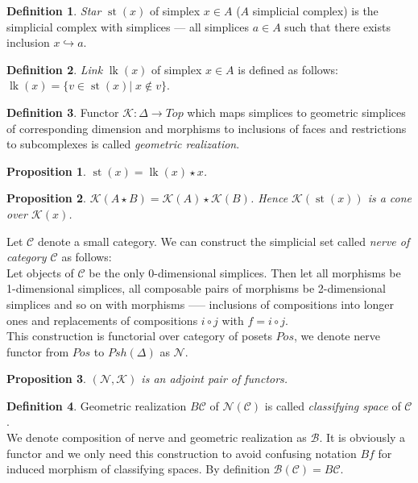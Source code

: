 \documentclass[a4paper, 12pt]{article}
\newtheorem{proposition}{Proposition}
\theoremstyle{definition}
\newtheorem{definition}{Definition}
\theoremstyle{remark}
\newcommand{\define}[1]{{\textit{#1}}}
\begin{document}
\begin{definition}
  \define{Star} $\operatorname{st}(x)$ of simplex $x \in A$ ($A$ simplicial complex) is the simplicial complex with simplices --- all simplices $a \in A$ such that there exists inclusion $x \hookrightarrow a$.
\end{definition}

\begin{definition}
  \define{Link} $\operatorname{lk}(x)$ of simplex $x \in A$ is defined as follows: $\operatorname{lk}(x) = \{v \in \operatorname{st}(x)|\; x \not\in v\}$.
\end{definition}

\begin{definition}
  Functor $\mathcal{K} : \Delta \to Top$ which maps simplices to geometric simplices of corresponding dimension and morphisms to inclusions of faces and restrictions to subcomplexes is called \define{geometric realization}.
\end{definition}

\begin{proposition}
  $\operatorname{st}(x) = \operatorname{lk}(x) \star x$.
\end{proposition}

\begin{proposition}
  $\mathcal{K}(A \star B) = \mathcal{K}(A) \star \mathcal{K}(B)$. Hence $\mathcal{K}(\operatorname{st}(x))$ is a cone over $\mathcal{K}(x)$.
\end{proposition}

Let $\mathcal{C}$ denote a small category. We can construct the simplicial set called \define{nerve of category $\mathcal{C}$} as follows:\\
Let objects of $\mathcal{C}$ be the only 0-dimensional simplices. Then let all morphisms be 1-dimensional simplices, all composable pairs of morphisms be 2-dimensional simplices and so on with morphisms ----- inclusions of compositions into longer ones and replacements of compositions $i \circ j$ with $f = i \circ j$.\\
This construction is functorial over category of posets $Pos$, we denote nerve functor from $Pos$ to $Psh(\Delta)$ as $\mathcal{N}$.

\begin{proposition}
  $(\mathcal{N},\mathcal{K})$ is an adjoint pair of functors.
\end{proposition}

\begin{definition}
  Geometric realization $B\mathcal{C}$ of $\mathcal{N}(\mathcal{C})$ is called \define{classifying space} of $\mathcal{C}$.\\

  We denote composition of nerve and geometric realization as $\mathcal{B}$. It is obviously a functor and we only need this construction to avoid confusing notation $Bf$ for induced morphism of classifying spaces. By definition $\mathcal{B}(\mathcal{C}) = B\mathcal{C}$.
\end{definition}
\end{document}
